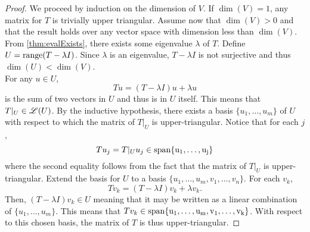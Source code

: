 \documentclass[../AlgebraQualSolutions.tex]{subfiles}
\begin{document}
\begin{proof}
    We proceed by induction on the dimension of $V$. If $\dim(V) = 1$, any matrix for $T$ is trivially upper triangular. Assume now that $\dim(V) > 0$ and that the result holds over any vector space with dimension less than $\dim(V)$. From \ref{thm:evalExists}, there exists some eigenvalue $\lambda$ of $T$. Define $U = \mathrm{range}(T - \lambda I)$. Since $\lambda$ is an eigenvalue, $T - \lambda I$ is not surjective and thus $\dim(U) < \dim(V)$.\\

    For any $u \in U$,
        \[Tu = (T - \lambda I)u + \lambda u\]
    is the sum of two vectors in $U$ and thus is in $U$ itself. This means that $T|_U \in \mathscr{L}(U)$. By the inductive hypothesis, there exists a basis $\{u_1,\ldots,u_m\}$ of $U$ with respect to which the matrix of $T|_U$ is upper-triangular. Notice that for each $j$,
        \[Tu_j = T|_Uu_j \in \rm{span}\{u_1,\ldots,u_j\}\]
    where the second equality follows from the fact that the matrix of $T|_U$ is upper-triangular. Extend the basis for $U$ to a basis $\{u_1,\ldots,u_m,v_1,\ldots,v_n\}$. For each $v_k$,
        \[Tv_k = (T -\lambda I)v_k + \lambda v_k.\]
    Then, $(T -\lambda I)v_k \in U$ meaning that it may be written as a linear combination of $\{u_1,\ldots, u_m\}$. This means that $Tv_k \in \rm{span}\{u_1,\ldots,u_m,v_1,\ldots, v_k\}$. With respect to this chosen basis, the  matrix of $T$ is thus upper-triangular.
\end{proof}
\end{document}
